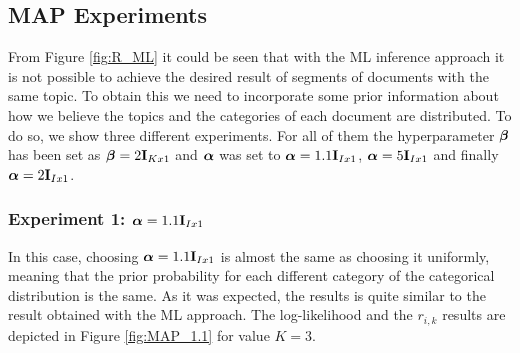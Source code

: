 \documentclass[12pt]{article}
\begin{document}
\subsection{MAP Experiments}

From Figure \ref{fig:R_ML} it could be seen that with the ML inference approach it is not possible to achieve the desired result of segments of documents with the same topic. To obtain this we need to incorporate some prior information about how we believe the topics and the categories of each document are distributed. To do so, we show three different experiments. For all of them the hyperparameter $\boldsymbol\beta$ has been set as $\boldsymbol\beta = 2\mathbf{I}_{Kx1}$ and $\boldsymbol\alpha$ was set to 
$\boldsymbol\alpha = 1.1\mathbf{I}_{Ix1}$, $\boldsymbol\alpha = 5\mathbf{I}_{Ix1}$ and finally $\boldsymbol\alpha = 2\mathbf{I}_{Ix1}$.

\subsubsection{Experiment 1: $\boldsymbol\alpha = 1.1\mathbf{I}_{Ix1}$} 

In this case, choosing $\boldsymbol\alpha = 1.1\mathbf{I}_{Ix1}$ is almost the same as choosing it uniformly, meaning that the prior probability for each different category of the categorical distribution is the same. As it was expected, the results is quite similar to the result obtained with the ML approach. The log-likelihood and the $r_{i,k}$ results are depicted in Figure \ref{fig:MAP_1.1} for value $K=3$.
\end{document}

